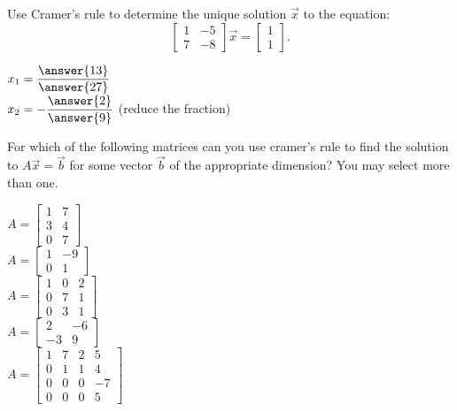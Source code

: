 \documentclass{ximera}
\begin{document}
      \begin{question} Use Cramer's rule to determine the unique solution $\vec{x}$ to the equation: $$\begin{bmatrix} 1 & -5 \\ 7& -8 \end{bmatrix}\vec{x} = \begin{bmatrix} 1\\1\end{bmatrix}.$$
      	
      	$x_1=\dfrac{\answer{13}}{\answer{27}}$\vspace{10pt}\\
      	$x_2=-\dfrac{\answer{2}}{\answer{9}}$ (reduce the fraction)\vspace{10pt}\\
      	
      	
      	
      	
      \end{question}	
       \begin{question} For which of the following matrices can you use cramer's rule to find the solution to $A\vec{x} = \vec{b}$ for some vector $\vec{b}$ of the appropriate dimension? You may select more than one.
       	
       	\begin{multipleChoice}
       		\choice $A = \begin{bmatrix} 1 &7\\ 3& 4\\ 0&7\end{bmatrix}$ \vspace{5pt}\\
       			\choice[correct] $A = \begin{bmatrix} 1 &-9\\ 0& 1\end{bmatrix}$ \vspace{5pt}\\
       		\choice[correct] $A = \begin{bmatrix} 1 &0 &2\\ 0&7& 1 \\0&3&1\end{bmatrix}$ \vspace{5pt}\\
       		\choice $A = \begin{bmatrix} 2 &-6\\ -3& 9\end{bmatrix}$ \vspace{5pt}\\	
       			\choice $A = \begin{bmatrix} 1 &7&2&5\\ 0&1&1& 4\\ 0&0&0&-7\\0&0&0&5\end{bmatrix}$ \vspace{5pt}\\
       		\end{multipleChoice}
       	
       	
       \end{question}	
\end{document}
